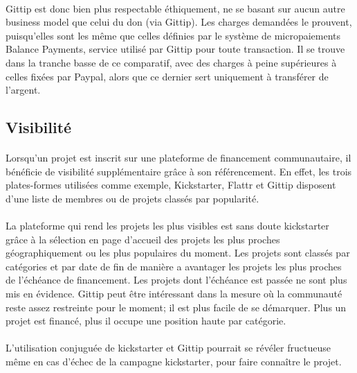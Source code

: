 \paragraph{}
Gittip est donc bien plus respectable éthiquement, ne se basant sur aucun autre
business model que celui du don (via Gittip). Les charges demandées le
prouvent, puisqu'elles sont les même que celles définies par le système de
micropaiements Balance Payments, service utilisé par Gittip pour toute
transaction. Il se trouve dans la tranche basse de ce comparatif, avec des
charges à peine supérieures à celles fixées par Paypal, alors que ce dernier
sert uniquement à transférer de l'argent.

\subsection{Visibilité}

\paragraph{}
Lorsqu'un projet est inscrit sur une plateforme de financement communautaire,
il bénéficie de visibilité supplémentaire grâce à son référencement. En effet,
les trois plates-formes utilisées comme exemple, Kickstarter, Flattr et Gittip
disposent d'une liste de membres ou de projets classés par popularité.

\paragraph{}
La plateforme qui rend les projets les plus visibles est sans doute kickstarter
grâce à la sélection en page d'accueil des projets les plus proches
géographiquement ou les plus populaires du moment. Les projets sont classés par
catégories et par date de fin de manière a avantager les projets les plus
proches de l'échéance de financement. Les projets dont l'échéance est passée ne
sont plus mis en évidence.
Gittip peut être intéressant dans la mesure où la communauté reste assez
restreinte pour le moment; il est plus facile de se démarquer. Plus un projet
est financé, plus il occupe une position haute par catégorie.

\paragraph{}
L'utilisation conjuguée de kickstarter et Gittip pourrait se révéler fructueuse
même en cas d'échec de la campagne kickstarter, pour faire connaître le projet.

